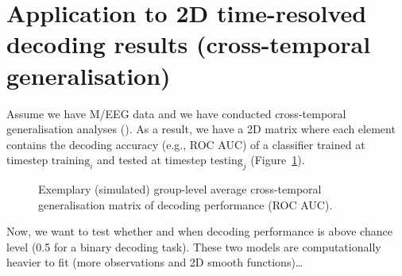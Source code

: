 \documentclass[
  doc,
  floatsintext,
  longtable,
  a4paper,
  nolmodern,
  notxfonts,
  notimes,
  colorlinks=true,linkcolor=blue,citecolor=blue,urlcolor=blue]{apa7}
\begin{document}
\section{Application to 2D time-resolved decoding results
(cross-temporal
generalisation)}\label{application-to-2d-time-resolved-decoding-results-cross-temporal-generalisation}

Assume we have M/EEG data and we have conducted cross-temporal
generalisation analyses (). As a result, we have a 2D matrix where each element contains the
decoding accuracy (e.g., ROC AUC) of a classifier trained at timestep
\(\text{training}_{i}\) and tested at timestep \(\text{testing}_{j}\)
(Figure~\ref{fig-sim-timegen}).

\begin{figure}[!htb]

\caption{\label{fig-sim-timegen}Exemplary (simulated) group-level
average cross-temporal generalisation matrix of decoding performance
(ROC AUC).}


\end{figure}%

Now, we want to test whether and when decoding performance is above
chance level (0.5 for a binary decoding task). These two models are
computationally heavier to fit (more observations and 2D smooth
functions)\ldots{}
\end{document}
